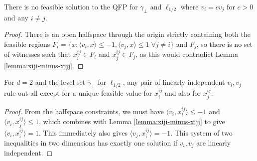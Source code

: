 \documentclass[final]{colt2020} %
\newcommand{\inprod}[2]{\langle #1, #2 \rangle}%
\begin{document}
\begin{lemma} \label{lemma:vi-neq-cvj}
	There is no feasible solution to the QFP for $\gamma_{\bot}$ and $\ell_{1/2}$ where $v_i = c v_j$ for $c > 0$ and any $i \neq j$.
\end{lemma}
\begin{proof}
	There is an open halfspace through the origin strictly containing both the feasible regions $F_i = \{x : \inprod{v_i}{x} \leq -1, \inprod{v_j}{x} \leq 1 \; \forall j \neq i\}$ and $F_j$, so there is no set of witnesses such that $x^{ij}_i \in F_i$ and $x^{ij}_j \in F_j$, as this would contradict Lemma \ref{lemma:xiji-minus-xijj}.
\end{proof}

\begin{lemma} \label{lemma:unique-spot-xiji}
	For $d=2$ and the level set $\gamma_\bot$ for $\ell_{1/2}$, any pair of linearly independent $v_i,v_j$ rule out all except for a unique feasible value for $x^{ij}_i$ and also for $x^{ij}_j$.
\end{lemma}
\begin{proof}
	From the halfspace constraints, we must have $\inprod{v_i}{x^{ij}_i} \leq -1$ and $\inprod{v_i}{x^{ij}_j} \leq 1$, which combines with Lemma \ref{lemma:xiji-minus-xijj} to give $\inprod{v_i}{x^{ij}_i} = 1$.
	This immediately also gives $\inprod{v_j}{x^{ij}_i} = -1$.
	This system of two inequalities in two dimensions has exactly one solution if $v_i,v_j$ are linearly independent.
\end{proof}
\end{document}
